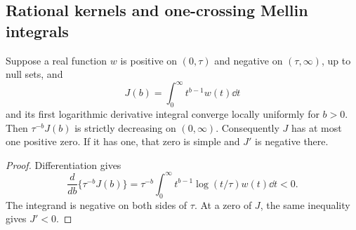 \subsection{Rational kernels and one-crossing Mellin integrals}
\begin{lemma}\label{neg:lem:mellin}
Suppose a real function $w$ is positive on $(0,\tau)$ and negative
on $(\tau,\infty)$, up to null sets, and
\[
 J(b)=\int_0^\infty t^{b-1}w(t)\dd t
\]
and its first logarithmic derivative integral converge locally uniformly
for $b>0$. Then $\tau^{-b}J(b)$ is strictly decreasing on $(0,\infty)$.
Consequently $J$ has at most one positive zero. If it has one, that
zero is simple and $J'$ is negative there.
\end{lemma}
\begin{proof}
Differentiation gives
\[
 \frac{d}{db}\{\tau^{-b}J(b)\}
 =\tau^{-b}\int_0^\infty
       t^{b-1}\log(t/\tau)w(t)\dd t<0.
\]
The integrand is negative on both sides of $\tau$. At a zero of
$J$, the same inequality gives $J'<0$.
\end{proof}

